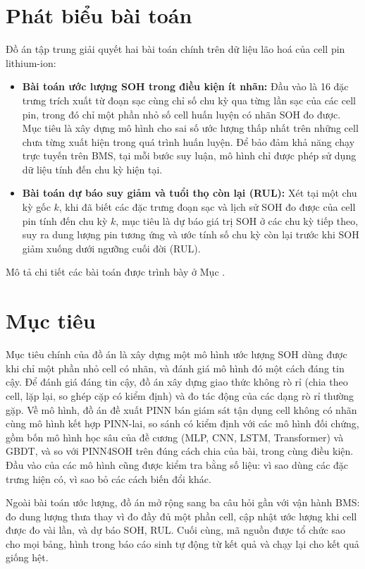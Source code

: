 \section{Phát biểu bài toán}
Đồ án tập trung giải quyết hai bài toán chính trên dữ liệu lão hoá của cell pin lithium-ion:

\begin{itemize}
    \item \textbf{Bài toán ước lượng SOH trong điều kiện ít nhãn:} Đầu vào là 16 đặc trưng trích xuất từ đoạn sạc cùng chỉ số chu kỳ qua từng lần sạc của các cell pin, trong đó chỉ một phần nhỏ số cell huấn luyện có nhãn SOH đo được. Mục tiêu là xây dựng mô hình cho sai số ước lượng thấp nhất trên những cell chưa từng xuất hiện trong quá trình huấn luyện. Để bảo đảm khả năng chạy trực tuyến trên BMS, tại mỗi bước suy luận, mô hình chỉ được phép sử dụng dữ liệu tính đến chu kỳ hiện tại.
    \item \textbf{Bài toán dự báo suy giảm và tuổi thọ còn lại (RUL):} Xét tại một chu kỳ gốc $k$, khi đã biết các đặc trưng đoạn sạc và lịch sử SOH đo được của cell pin tính đến chu kỳ $k$, mục tiêu là dự báo giá trị SOH ở các chu kỳ tiếp theo, suy ra dung lượng pin tương ứng và ước tính số chu kỳ còn lại trước khi SOH giảm xuống dưới ngưỡng cuối đời (RUL).
\end{itemize}

Mô tả chi tiết các bài toán được trình bày ở Mục .
\section{Mục tiêu}

Mục tiêu chính của đồ án là xây dựng một mô hình ước lượng SOH dùng được khi chỉ một phần nhỏ cell có nhãn, và
đánh giá mô hình đó một cách đáng tin cậy. Để đánh giá đáng tin cậy, đồ án xây dựng giao thức không rò rỉ (chia theo
cell, lặp lại, so ghép cặp có kiểm định) và đo tác động của các dạng rò rỉ thường gặp. Về mô hình, đồ án đề xuất PINN
bán giám sát tận dụng cell không có nhãn cùng mô hình kết hợp PINN-lai, so sánh có kiểm định với các mô hình đối chứng,
gồm bốn mô hình học sâu của đề cương (MLP, CNN, LSTM, Transformer) và GBDT, và so với PINN4SOH trên đúng cách chia của
bài, trong cùng điều kiện. Đầu vào của các mô hình cũng được kiểm tra bằng số liệu: vì sao dùng các đặc trưng hiện có,
vì sao bỏ các cách biến đổi khác.

Ngoài bài toán ước lượng, đồ án mở rộng sang ba câu hỏi gần với vận hành BMS: đo dung lượng thưa thay vì đo đầy đủ một
phần cell, cập nhật ước lượng khi cell được đo vài lần, và dự báo SOH, RUL. Cuối cùng, mã nguồn được tổ chức sao cho mọi
bảng, hình trong báo cáo sinh tự động từ kết quả và chạy lại cho kết quả giống hệt.

